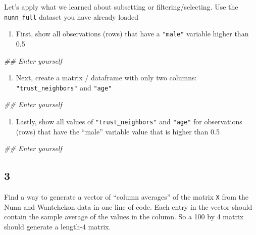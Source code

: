 \documentclass[]{book}
\newenvironment{Shaded}{\begin{snugshade}}{\end{snugshade}}
\newcommand{\CommentTok}[1]{\textcolor[rgb]{0.56,0.35,0.01}{\textit{#1}}}
\providecommand{\tightlist}{%
  \setlength{\itemsep}{0pt}\setlength{\parskip}{0pt}}
\theoremstyle{definition}
\theoremstyle{definition}
\theoremstyle{definition}
\theoremstyle{remark}
\begin{document}
Let's apply what we learned about subsetting or filtering/selecting. Use the \texttt{nunn\_full} dataset you have already loaded

\begin{enumerate}
\def\labelenumi{\alph{enumi})}
\tightlist
\item
  First, show all observations (rows) that have a \texttt{"male"} variable higher than 0.5
\end{enumerate}

\begin{Shaded}
\begin{Highlighting}[]
\CommentTok{## Enter yourself}
\end{Highlighting}
\end{Shaded}

\begin{enumerate}
\def\labelenumi{\alph{enumi})}
\setcounter{enumi}{1}
\tightlist
\item
  Next, create a matrix / dataframe with only two columns: \texttt{"trust\_neighbors"} and \texttt{"age"}
\end{enumerate}

\begin{Shaded}
\begin{Highlighting}[]
\CommentTok{## Enter yourself}
\end{Highlighting}
\end{Shaded}

\begin{enumerate}
\def\labelenumi{\alph{enumi})}
\setcounter{enumi}{2}
\tightlist
\item
  Lastly, show all values of \texttt{"trust\_neighbors"} and \texttt{"age"} for observations (rows) that have the ``male'' variable value that is higher than 0.5
\end{enumerate}

\begin{Shaded}
\begin{Highlighting}[]
\CommentTok{## Enter yourself}
\end{Highlighting}
\end{Shaded}

\hypertarget{section-11}{%
\subsection*{3}\label{section-11}}

Find a way to generate a vector of ``column averages'' of the matrix \texttt{X} from the Nunn and Wantchekon data in one line of code. Each entry in the vector should contain the sample average of the values in the column. So a 100 by 4 matrix should generate a length-4 matrix.
\end{document}
